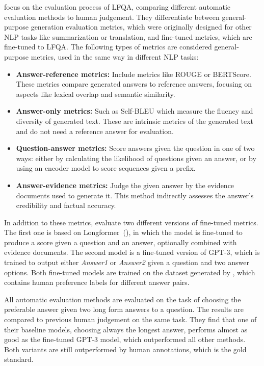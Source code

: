 \cite{xu:2023:A} focus on the evaluation process of LFQA, comparing different automatic evaluation methods to human judgement.
They differentiate between general-purpose generation evaluation metrics, which were originally designed for other NLP tasks like summarization or translation, and fine-tuned metrics, which are fine-tuned to LFQA.
The following types of metrics are considered general-purpose metrics, used in the same way in different NLP tasks:
\begin{itemize}
\item \textbf{Answer-reference metrics:} Include metrics like ROUGE or BERTScore. These metrics compare generated answers to reference answers, focusing on aspects like lexical overlap and semantic similarity.
\item \textbf{Answer-only metrics:} Such as Self-BLEU which measure the fluency and diversity of generated text. These are intrinsic metrics of the generated text and do not need a reference answer for evaluation.
\item \textbf{Question-answer metrics:} Score answers given the question in one of two ways: either by calculating the likelihood of questions given an answer, or by using an encoder model to score sequences given a prefix.
\item \textbf{Answer-evidence metrics:} Judge the given answer by the evidence documents used to generate it. This method indirectly assesses the answer's credibility and factual accuracy.
\end{itemize}
In addition to these metrics, \cite{xu:2023:A} evaluate two different versions of fine-tuned metrics.
The first one is based on Longformer~(\cite{beltagy:2020:Longformer}), in which the model is fine-tuned to produce a score given a question and an answer, optionally combined with evidence documents.
The second model is a fine-tuned version of GPT-3, which is trained to output either \emph{Answer1} or \emph{Answer2} given a question and two answer options.
Both fine-tuned models are trained on the dataset generated by \cite{nakano:2021:Webgpt}, which contains human preference labels for different answer pairs.

All automatic evaluation methods are evaluated on the task of choosing the preferable answer given two long form answers to a question.
The results are compared to previous human judgement on the same task.
They find that one of their baseline models, choosing always the longest answer, performs almost as good as the fine-tuned GPT-3 model, which outperformed all other methods.
Both variants are still outperformed by human annotations, which is the gold standard.

